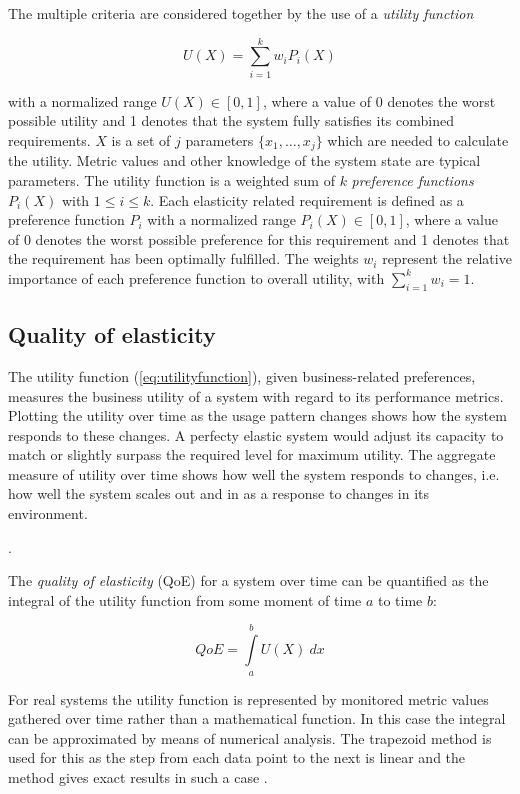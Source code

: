 \documentclass[english]{tktltiki2}
\theoremstyle{definition}
\theoremstyle{remark}
\begin{document}
The multiple criteria are considered together by the use of a \emph{utility
function}

\begin{equation}
U(X) = \sum\limits_{i=1}^k w_{i}P_{i}(X) \label{eq:utilityfunction}
\end{equation}

with a normalized range $U(X) \in [0, 1]$, where a value of 0 denotes the worst
possible utility and 1 denotes that the system fully satisfies its combined
requirements. $X$ is a set of $j$ parameters $\{x_{1}, \dots, x_{j}\}$ which are
needed to calculate the utility. Metric values and other knowledge of the system
state are typical parameters. The utility function is a weighted sum of $k$
\emph{preference functions} $P_{i}(X)$ with $1 \le i \le k$. Each elasticity
related requirement is defined as a preference function $P_{i}$ with a
normalized range $P_{i}(X) \in [0, 1]$, where a value of 0 denotes the worst
possible preference for this requirement and 1 denotes that the requirement has
been optimally fulfilled. The weights $w_{i}$ represent the relative importance
of each preference function to overall utility, with $\sum_{i=1}^k w_{i} = 1$.


\subsection{Quality of elasticity} The utility function (\ref{eq:utilityfunction}),
given business-related preferences, measures the business utility of a system
with regard to its performance metrics. Plotting the utility over time as the
usage pattern changes shows how the system responds to these changes. A perfecty
elastic system would adjust its capacity to match or slightly surpass the
required level for maximum utility. The aggregate measure of utility over time
shows how well the system responds to changes, i.e. how well the system scales
out and in as a response to changes in its environment.

.

The \emph{quality of elasticity} (QoE) for a system over time can be quantified
as the integral of the utility function from some moment of time $a$ to time
$b$:

\begin{equation}
QoE = \int\limits_a^b U(X)~dx \label{qoefunction}
\end{equation}

For real systems the utility function is represented by monitored metric values
gathered over time rather than a mathematical function. In this case the
integral can be approximated by means of numerical analysis. The trapezoid
method  is used for this as the step from each data
point to the next is linear and the method gives exact results in such a case
.
\end{document}
